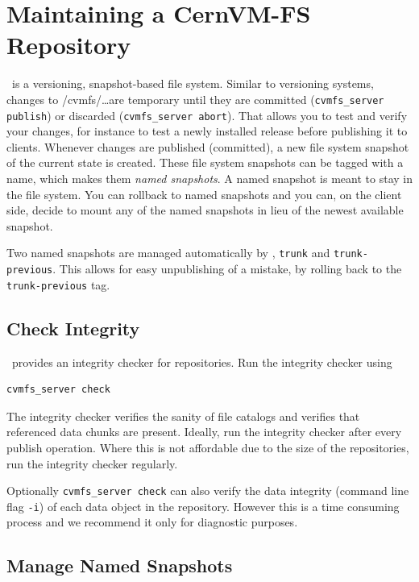 \section{Maintaining a CernVM-FS Repository}

\cvmfs\ is a versioning, snapshot-based file system. 
Similar to versioning systems, changes to /cvmfs/\dots are temporary until they are committed (\texttt{cvmfs\_server publish}) or discarded (\texttt{cvmfs\_server abort}). 
That allows you to test and verify your changes, for instance to test a newly installed release before publishing it to clients.
Whenever changes are published (committed), a new file system snapshot of the current state is created. 
These file system snapshots can be tagged with a name, which makes them \emph{named snapshots}. 
A named snapshot is meant to stay in the file system. 
You can rollback to named snapshots and you can, on the client side, decide to mount any of the named snapshots in lieu of the newest available snapshot.

Two named snapshots are managed automatically by \cvmfs, \texttt{trunk} and \texttt{trunk-previous}. 
This allows for easy unpublishing of a mistake, by rolling back to the \texttt{trunk-previous} tag.

\subsection{Check Integrity}
\label{sct:checkintegrity}
\cvmfs\ provides an integrity checker for repositories.
Run the integrity checker using
\begin{verbatim}
cvmfs_server check
\end{verbatim}

The integrity checker verifies the sanity of file catalogs and verifies that referenced data chunks are present.
Ideally, run the integrity checker after every publish operation.
Where this is not affordable due to the size of the repositories, run the integrity checker regularly.

Optionally \texttt{cvmfs\_server check} can also verify the data integrity (command line flag \texttt{-i}) of each data object in the repository.
However this is a time consuming process and we recommend it only for diagnostic purposes.

\subsection{Manage Named Snapshots}

